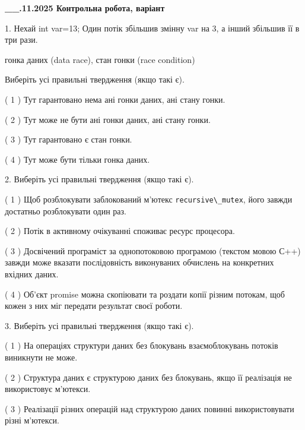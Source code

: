 \documentclass[12pt, ukrainian]{article}
\def\code#1{\Verb!#1!}
\begin{document}
\newpage
\begin {large}

\textbf{\_\_.11.2025 Контрольна робота, варіант  }\par


{
1. Нехай int var=13; Один потік збільшив змінну var на 3, а інший збільшив її в три рази.

гонка даних (data race), стан гонки (race condition)

Виберіть усі правильні твердження (якщо такі є).\par
\vspace{2mm}
( 1 ) Тут гарантовано нема ані гонки даних, ані стану гонки.%

( 2 ) Тут може не бути ані гонки даних, ані стану гонки.%

( 3 ) Тут гарантовано є стан гонки.%

( 4 ) Тут може бути тільки гонка даних.%


2. Виберіть усі правильні твердження (якщо такі є).\par
\vspace{2mm}

( 1 ) Щоб розблокувати заблокований м’ютекс \code{recursive\_mutex}, його завжди достатньо розблокувати один раз.%

( 2 ) Потік в активному очікуванні споживає ресурс процесора.%

( 3 ) Досвічений програміст за однопотоковою програмою (текстом мовою С++) завжди може вказати послідовність виконуваних обчислень на конкретних вхідних даних.%

( 4 ) Об’єкт promise можна скопіювати та роздати копії різним потокам, щоб кожен з них міг передати результат своєї роботи.%


3. Виберіть усі правильні твердження (якщо такі є).\par
\vspace{2mm}

( 1 ) На операціях структури даних без блокувань взаємоблокувань потоків виникнути не може.%

( 2 ) Структура даних є структурою даних без блокувань, якщо її реалізація не використовує м’ютекси.%

( 3 ) Реалізації різних операцій над структурою даних повинні використовувати різні м’ютекси.%

}
\end{large}
\end{document}
